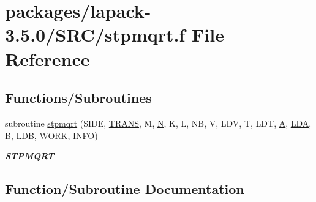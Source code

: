 \hypertarget{stpmqrt_8f}{}\section{packages/lapack-\/3.5.0/\+S\+R\+C/stpmqrt.f File Reference}
\label{stpmqrt_8f}
\subsection*{Functions/\+Subroutines}
\begin{DoxyCompactItemize}
\item 
subroutine \hyperlink{stpmqrt_8f_a47352c862183c6b03b47598070678a04}{stpmqrt} (S\+I\+D\+E, \hyperlink{superlu__enum__consts_8h_a0c4e17b2d5cea33f9991ccc6a6678d62a1f61e3015bfe0f0c2c3fda4c5a0cdf58}{T\+R\+A\+N\+S}, M, \hyperlink{polmisc_8c_a0240ac851181b84ac374872dc5434ee4}{N}, K, L, N\+B, V, L\+D\+V, T, L\+D\+T, \hyperlink{classA}{A}, \hyperlink{example__user_8c_ae946da542ce0db94dced19b2ecefd1aa}{L\+D\+A}, B, \hyperlink{example__user_8c_a50e90a7104df172b5a89a06c47fcca04}{L\+D\+B}, W\+O\+R\+K, I\+N\+F\+O)
\begin{DoxyCompactList}\small\item\em {\bfseries S\+T\+P\+M\+Q\+R\+T} \end{DoxyCompactList}\end{DoxyCompactItemize}


\subsection{Function/\+Subroutine Documentation}
\hypertarget{stpmqrt_8f_a47352c862183c6b03b47598070678a04}{}
